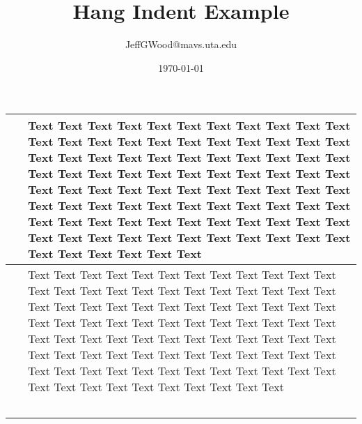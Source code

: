 \documentclass[a4paper,10pt]{article}
\title{Hang Indent Example}
\author{JeffGWood@mavs.uta.edu}
\date{\today}
\newcommand{\logentry}[4]{ \selectlanguage{USenglish} \formatdate{#2}{#1}{#3}  & {#4}  \\ \hline}
\begin{document}
\begin{tabular}{p{3cm} p{12cm}}\hline
\logentry{9}{28}{2014}{Text Text Text Text Text Text Text Text Text Text Text Text Text Text Text Text Text Text Text Text Text Text Text Text Text Text Text Text Text Text Text Text Text Text Text Text Text Text Text Text Text Text Text Text Text Text Text Text Text Text Text Text Text Text Text Text Text Text Text Text Text Text Text Text Text Text Text Text Text Text Text Text Text Text Text Text Text Text Text Text Text Text Text Text Text Text Text Text Text Text Text Text Text Text}
\logentry{9}{28}{2014}{Text Text Text Text Text Text Text Text Text Text Text Text Text Text Text Text Text Text Text Text Text Text Text Text Text Text Text Text Text Text Text Text Text Text Text Text Text Text Text Text Text Text Text Text Text Text Text Text Text Text Text Text Text Text Text Text Text Text Text Text Text Text Text Text Text Text Text Text Text Text Text Text Text Text Text Text Text Text Text Text Text Text Text Text Text Text Text Text Text Text Text Text Text Text}
\
\end{tabular}
\end{document}
